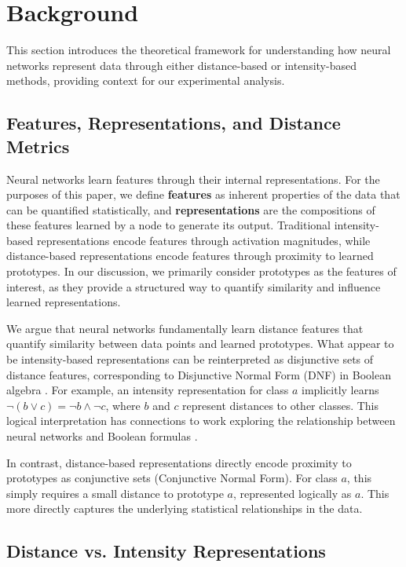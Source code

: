 \section{Background}
\label{sec:background}

This section introduces the theoretical framework for understanding how neural networks represent data through either distance-based or intensity-based methods, providing context for our experimental analysis.

\subsection{Features, Representations, and Distance Metrics}

Neural networks learn features through their internal representations. For the purposes of this paper, we define \textbf{features} as inherent properties of the data that can be quantified statistically, and \textbf{representations} are the compositions of these features learned by a node to generate its output. Traditional intensity-based representations encode features through activation magnitudes, while distance-based representations encode features through proximity to learned prototypes. In our discussion, we primarily consider prototypes as the features of interest, as they provide a structured way to quantify similarity and influence learned representations.

We argue that neural networks fundamentally learn distance features that quantify similarity between data points and learned prototypes. What appear to be intensity-based representations can be reinterpreted as disjunctive sets of distance features, corresponding to Disjunctive Normal Form (DNF) in Boolean algebra \cite{post1921introduction}. For example, an intensity representation for class $a$ implicitly learns $\lnot(b \lor c) = \lnot b \land \lnot c$, where $b$ and $c$ represent distances to other classes. This logical interpretation has connections to work exploring the relationship between neural networks and Boolean formulas \cite{anthony2003boolean}.

In contrast, distance-based representations directly encode proximity to prototypes as conjunctive sets (Conjunctive Normal Form). For class $a$, this simply requires a small distance to prototype $a$, represented logically as $a$. This more directly captures the underlying statistical relationships in the data.

\subsection{Distance vs. Intensity Representations}
\label{subsec:dist-intensity-rep}

